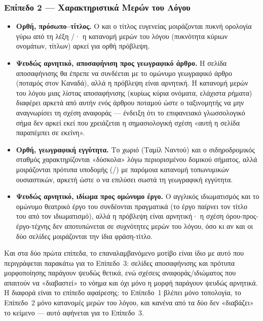 \subsubsection{Επίπεδο 2 --- Χαρακτηριστικά Μερών του Λόγου}

\begin{itemize}
  \item \textbf{Ορθή, πρόσωπο--τίτλος.} Ο  και ο τίτλος ευγενείας 
  μοιράζονται πυκνή ορολογία γύρω από τη λέξη /· η
  κατανομή μερών του λόγου (πυκνότητα κύριων ονομάτων, τίτλων) αρκεί για ορθή
  πρόβλεψη.
  \item \textbf{Ψευδώς αρνητικό, αποσαφήνιση προς γεωγραφικό άρθρο.} Η σελίδα
  αποσαφήνισης  θα έπρεπε να συνδέεται με το ομώνυμο γεωγραφικό
  άρθρο (ποταμός στον Καναδά), αλλά η πρόβλεψη είναι αρνητική.
  Η κατανομή μερών
  του λόγου μιας λίστας αποσαφήνισης (κυρίως κύρια ονόματα, ελάχιστα ρήματα)
  διαφέρει αρκετά από αυτήν ενός άρθρου ποταμού ώστε ο ταξινομητής να μην
  αναγνωρίσει τη σχέση αναφοράς --- ένδειξη ότι το επιφανειακό γλωσσολογικό
  σήμα δεν αρκεί εκεί που χρειάζεται η σημασιολογική σχέση «αυτή η σελίδα
  παραπέμπει σε εκείνη».
  \item \textbf{Ορθή, γεωγραφική εγγύτητα.} Το χωριό 
  (Ταμίλ Ναντού) και ο σιδηροδρομικός σταθμός  χαρακτηρίζονται
  «δύσκολα» λόγω περιορισμένου δομικού σήματος, αλλά μοιράζονται πρότυπα
  υποδομής (/) με παρόμοια κατανομή
  τοπωνυμικών ουσιαστικών, αρκετή ώστε ο  να επιλύσει σωστά τη
  γεωγραφική εγγύτητα.
  \item \textbf{Ψευδώς αρνητικό, ιδίωμα προς ομώνυμο έργο.} Ο αγγλικός
  ιδιωματισμός  και το ομώνυμο θεατρικό έργο του  συνδέονται πραγματικά (το έργο παίρνει τον τίτλο του από τον
  ιδιωματισμό), αλλά η πρόβλεψη είναι αρνητική· η σχέση όρου-προς-έργο-τέχνης
  δεν αποτυπώνεται σε συχνότητες μερών του λόγου, όσο κι αν και οι δύο σελίδες
  μοιράζονται την ίδια φράση-τίτλο.
\end{itemize}

Και στα δύο πρώτα επίπεδα, το επαναλαμβανόμενο μοτίβο είναι ίδιο με αυτό που
περιγράφεται παρακάτω για το Επίπεδο~3: σελίδες αποσαφήνισης και πρότυπα
μορφοποίησης παράγουν ψευδώς θετικά, ενώ σχέσεις αναφοράς/ιδιώματος που
απαιτούν να «διαβαστεί» το νόημα και όχι μόνο η μορφή παράγουν ψευδώς αρνητικά.
Η διαφορά είναι το επίπεδο αφαίρεσης: το Επίπεδο~1 βλέπει μόνο τοπολογία, το
Επίπεδο~2 μόνο κατανομές μερών του λόγου, και κανένα από τα δύο δεν «διαβάζει»
το κείμενο --- αυτό αφήνεται για το Επίπεδο~3.

